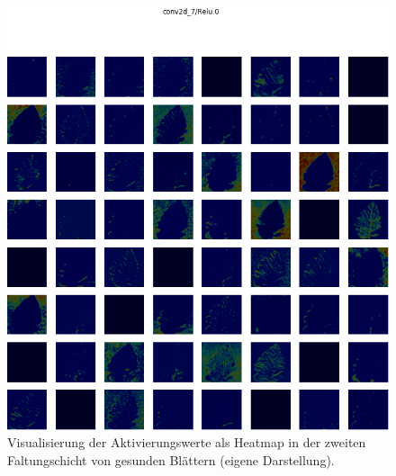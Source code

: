 \begin{figure}[h!]
	\centering
	\includegraphics[width=\textwidth]{visualisierungen/healthy/heatmap_mit/conv2d_7.png}
	\caption{Visualisierung der Aktivierungswerte als Heatmap in der zweiten Faltungschicht von gesunden Blättern (eigene Darstellung).}
	\label{}
\end{figure}

